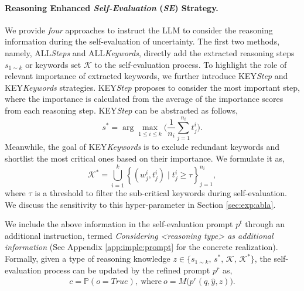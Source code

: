 \documentclass[11pt]{article}
\begin{document}
\paragraph{Reasoning Enhanced \textit{Self-Evaluation} (\textit{SE}) Strategy.} 
We provide \textit{four} approaches to instruct the LLM to consider the reasoning information during the self-evaluation of uncertainty. 
The first two methods, namely, {\small ALL}\textit{Steps} and {\small ALL}\textit{Keywords}, directly add the extracted reasoning steps $s_{1 \sim k}$ or keywords set $\mathcal{K}$ to the self-evaluation process.
To highlight the role of relevant importance of extracted keywords, we further introduce {\small KEY}\textit{Step} and {\small KEY}\textit{Keywords} strategies. {\small KEY}\textit{Step} proposes to consider the most important step, where the importance is calculated from the average of the importance scores from each reasoning step. {\small KEY}\textit{Step} can be abstracted as follows,
\begin{equation}
\label{eq:7}    
s^* = \arg\max_{1 \le i \le k}
\Biggl(
\frac{1}{n_i}\sum_{j=1}^{n_i} t_j^i
\Biggr).
\end{equation}
Meanwhile, the goal of {\small KEY}\textit{Keywords} is to exclude redundant keywords and shortlist the most critical ones based on their importance. We formulate it as,
\begin{equation}
\label{eq:8}
    \mathcal{K}^* = \bigcup_{i=1}^{k} \left\{ (w_j^i, t_j^i) \mid t_j^i \ge \tau \right\}_{j=1}^{n_i},
\end{equation}
where $\tau$ is a threshold to filter the sub-critical keywords during self-evaluation. We discuss the sensitivity to this hyper-parameter in Section \ref{sec:exp:abla}.

We include the above information in the self-evaluation prompt $p^t$ through an additional instruction, termed \textit{Considering <reasoning type> as additional information} (See Appendix \ref{app:imple:prompt} for the concrete realization). Formally, given a type of reasoning knowledge $z \in \bigl\{s_{1 \sim k},\, s^*,\, \mathcal{K},\, \mathcal{K}^*\bigr\}$, the self-evaluation process can be updated by the refined prompt $p^r$ as,
\begin{equation}
\begin{aligned}
\label{eq:9}
    c = \mathbb{P}(o = \textit{True}), \ \text{where}\ o = M\bigl(p^{r}(q, \hat{y}, z)\bigr).
\end{aligned}
\end{equation}
\end{document}
